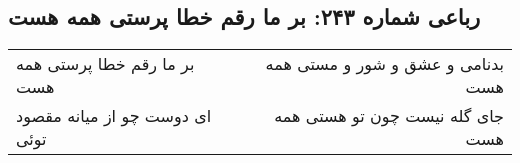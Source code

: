 \begin{center}
\section*{رباعی شماره ۲۴۳: بر ما رقم خطا پرستی همه هست}
\label{sec:0243}
\begin{longtable}{l p{0.5cm} r}
بر ما رقم خطا پرستی همه هست
&&
بدنامی و عشق و شور و مستی همه هست
\\
ای دوست چو از میانه مقصود توئی
&&
جای گله نیست چون تو هستی همه هست
\\
\end{longtable}
\end{center}
